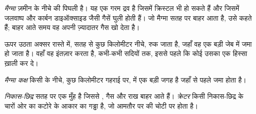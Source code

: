 \begin{definition}[मैग्मा]\label{def:g7:volcanoes:magma}
\emph{मैग्मा} ज़मीन के नीचे की पिघली  है। यह एक गरम द्रव
है जिसमें क्रिस्टल भी हो सकते हैं और जिसमें जलवाष्प और कार्बन डाइऑक्साइड जैसी
गैसें घुली होती हैं। जो मैग्मा सतह पर बाहर आता है, उसे  कहते हैं; बाहर
आते समय वह अपनी ज़्यादातर गैस खो देता है।
\end{definition}

ऊपर उठता  अक्सर रास्ते में, सतह से कुछ किलोमीटर नीचे, रुक जाता है, जहाँ
वह एक बड़ी जेब में जमा हो जाता है। वहाँ वह इंतज़ार करता है, कभी-कभी सदियों तक,
इससे पहले कि कोई  उसका एक हिस्सा ख़ाली कर दे।

\begin{definition}[मैग्मा कक्ष]\label{def:g7:volcanoes:magma-chamber}
\emph{मैग्मा कक्ष} किसी  के नीचे, कुछ किलोमीटर
गहराई पर,  में एक बड़ी जगह है जहाँ  से पहले  जमा
होता है।
\end{definition}

\begin{definition}[निकास-छिद्र और क्रेटर]\label{def:g7:volcanoes:vent}
\emph{निकास-छिद्र} सतह पर एक मुँह है जिससे , गैस और
राख बाहर आते हैं। \emph{क्रेटर} किसी निकास-छिद्र के चारों ओर का
कटोरे के आकार का गड्ढा है, जो आमतौर पर  की चोटी पर होता है।
\end{definition}


